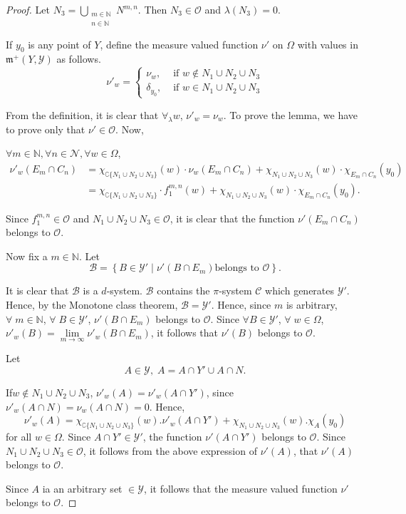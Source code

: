 \begin{proof}
Let $N_3 = \bigcup\limits_{\substack{m\in\mathbb{N} \\ n \in
    \mathbb{N}}} N^{m,n}$. Then $N_3\in \mathscr{O}$ and $\lambda(N_3)
= 0$. 

If $y_0$ is any point of $Y$, define the measure valued function
$\nu'$ on $\Omega$ with values in $\mathfrak{m}^+ (Y, \mathscr{Y})$ as
follows. 
$$
\nu'_w=
\begin{cases}
\nu_w, & \text{ if } w \not\in N_1 \cup N_2 \cup N_3\\
\delta_{y_0}, & \text{ if } w \in N_1 \cup N_2 \cup N_3
\end{cases}
$$

From the definition, it is clear that $\forall_\lambda w$, $\nu'_w =
\nu_w$. To prove the lemma, we have to prove only  that $\nu' \in
\mathscr{O}$. Now, 

$\forall m \in \mathbb{N}, \forall n \in \mathscr{N}, \forall w \in
\Omega$,
{\fontsize{9}{11}\selectfont
\begin{align*}
\nu'_w (E_m \cap C_n) & = \chi_{\complement \{N_1\cup N_2 \cup N_3\}}
(w) \cdot \nu_w (E_m \cap C_n) + \chi_{N_1 \cup N_2 \cup N_3} (w)
\cdot \chi_{E_m\cap C_n} (y_0)\\
& = \chi_{\complement\{N_1 \cup N_2 \cup N_3\}} \cdot f^{m,n}_1 (w) +
\chi_{N_1 \cup N_2 \cup N_3} (w) \cdot \chi_{E_m \cap C_n} (y_0). 
\end{align*}}\relax

Since $f^{m,n}_1 \in \mathscr{O}$ and $N_1 \cup N_2 \cup N_3 \in
\mathscr{O}$, it is clear that the function $\nu' (E_m \cap C_n)$
belongs to $\mathscr{O}$. 

Now fix a $m \in \mathbb{N}$. Let 
$$
\mathscr{B} = \left\{ B \in \mathscr{Y}' \mid \nu' (B \cap E_m) \text{
belongs to } \mathscr{O}\right\}. 
$$

It is clear that $\mathscr{B}$ is a $d$-system. $\mathscr{B}$ contains
the $\pi$-system $\mathscr{C}$ which generates $\mathscr{Y}'$. Hence,
by the Monotone class theorem, $\mathscr{B}= \mathscr{Y}'$. Hence,
since $m$ is arbitrary, $\forall \; m \in \mathbb{N}$, $\forall \;B
\in \mathscr{Y}'$, $\nu' (B\cap E_m)$ belongs to $\mathscr{O}$. Since
$\forall B \in \mathscr{Y}'$, $\forall \; w \in \Omega$, $\nu'_w (B) =
\lim\limits_{m \to \infty} \nu'_w(B\cap E_m)$, it follows that
$\nu'(B)$ belongs to $\mathscr{O}$. 

Let 
$$
A \in \mathscr{Y}, \; A= A \cap Y' \cup A \cap N. 
$$

If\pageoriginale $w \not\in N_1 \cup N_2 \cup N_3$, $\nu'_w(A) =
\nu'_w (A \cap Y')$, since $\nu'_w(A \cap N) = \nu_w (A \cap N)
=0$. Hence,  
$$
\nu'_w(A) = \chi_{\complement \{N_1 \cup N_2 \cup N_3\}} (w). \nu'_w
(A \cap Y') + \chi_{N_1 \cup N_2 \cup N_3} (w). \chi_A(y_0) 
$$
for all $w \in\Omega$. Since $A \cap Y' \in \mathscr{Y}'$, the
function $\nu'(A\cap Y')$ belongs to $\mathscr{O}$. Since $N_1 \cup
N_2 \cup N_3 \in \mathscr{O}$, it follows from the above expression of
$\nu'(A)$, that $\nu'(A)$ belongs to $\mathscr{O}$. 

Since $A$ ia an arbitrary set $\in \mathscr{Y}$, it follows that the
measure valued function $\nu'$ belongs to $\mathscr{O}$. 
\end{proof}

